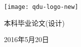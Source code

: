 \begin{titlepage}

\vspace*{2cm}

\begin{center}
\texttt{[image: qdu-logo-new]}

\vspace{1cm}

{\fontsize{40}{40}\selectfont\heiti 本科毕业论文(设计)}
\end{center}
\vspace{1cm}

\setlength{\leftskip}{2.5cm}
\begin{spacing}{2.0}
\large
{} \noindent\underline{}

 \noindent\underline{}

 \noindent\underline{}

 \noindent\underline{}

 \noindent\underline{}

\setlength{\leftskip}{0pt}
\end{spacing}

\vspace{2cm}
\begin{center}
\large2016年5月20日
\end{center}

\end{titlepage}